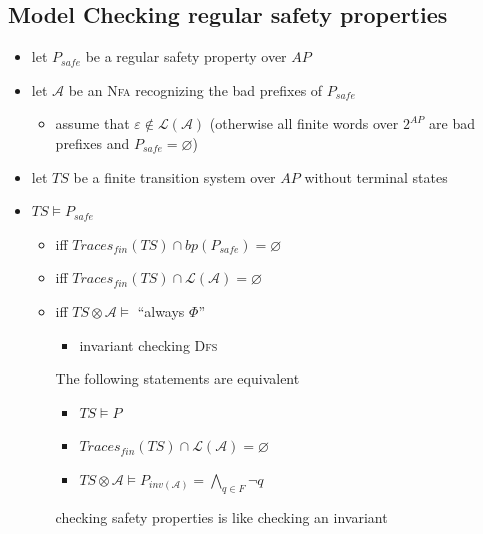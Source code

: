 \documentclass[a4paper, 10pt]{article}
\begin{document}
\subsection*{Model Checking regular safety properties}
\begin{minipage}[t]{0.48\textwidth}
\begin{itemize}
    \item let $P_{safe}$ be a regular safety property over $AP$
    \item let $\mathcal{A}$ be an \textsc{Nfa} recognizing the bad prefixes of $P_{safe}$
    \begin{itemize}
        \item assume that $\varepsilon\not\in\mathcal{L}(\mathcal{A})$ (otherwise all finite words over $2^{AP}$ are bad prefixes and $P_{safe}=\varnothing$)
    \end{itemize}
    \item let $TS$ be a finite transition system over $AP$ without terminal states
    \item $TS\models P_{safe}$
    \begin{itemize}
        \item iff $Traces_{fin}(TS)\cap bp(P_{safe})=\varnothing$
        \item iff $Traces_{fin}(TS)\cap \mathcal{L}(\mathcal{A})=\varnothing$
        \item iff $TS\otimes\mathcal{A}\models $ ``always $\Phi$''
        \begin{itemize}
            \item invariant checking \follows  \textsc{Dfs}
        \end{itemize}
        \begin{shaded}
            The following statements are equivalent
            \begin{itemize}
                \item $TS\models P$
                \item $Traces_{fin}(TS)\cap\mathcal{L}(\mathcal{A})=\varnothing$
                \item $TS\otimes\mathcal{A} \models P_{inv(\mathcal{A})}=\bigwedge_{q\in F} \neg q$
            \end{itemize}
            \follows checking safety properties is like checking an invariant
        \end{shaded}
    \end{itemize}
\end{itemize}
\end{minipage}
\end{document}

